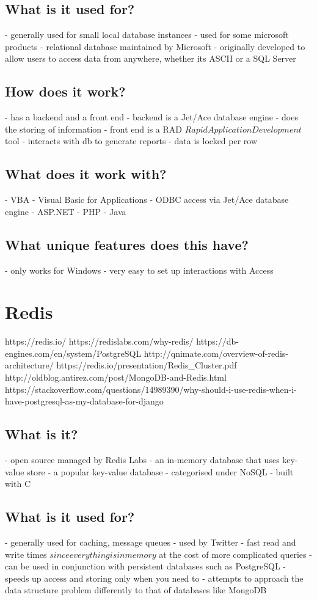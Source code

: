 \section{What is it used for?}
- generally used for small local database instances
- used for some microsoft products
- relational database maintained by Microsoft
- originally developed to allow users to access data from anywhere, whether its ASCII or a SQL Server

\section{How does it work?}
- has a backend and a front end
- backend is a Jet/Ace database engine - does the storing of information
- front end is a RAD \(Rapid Application Development\) tool - interacts with db to generate reports
- data is locked per row

\section{What does it work with?}
- VBA - Visual Basic for Applications
- ODBC access via Jet/Ace database engine
- ASP.NET
- PHP
- Java

\section{What unique features does this have?}
- only works for Windows
- very easy to set up interactions with Access

\chapter{Redis}
https://redis.io/
https://redislabs.com/why-redis/
https://db-engines.com/en/system/PostgreSQL%
http://qnimate.com/overview-of-redis-architecture/
https://redis.io/presentation/Redis_Cluster.pdf
http://oldblog.antirez.com/post/MongoDB-and-Redis.html
https://stackoverflow.com/questions/14989390/why-should-i-use-redis-when-i-have-postgresql-as-my-database-for-django

\section{What is it?}
- open source managed by Redis Labs
- an in-memory database that uses key-value store
- a popular key-value database - categorised under NoSQL
- built with C

\section{What is it used for?}
- generally used for caching, message queues
- used by Twitter
- fast read and write times \(since everything is in memory\) at the cost of more complicated queries
- can be used in conjunction with persistent databases such as PostgreSQL - speeds up access and storing only when you need to
- attempts to approach the data structure problem differently to that of databases like MongoDB

